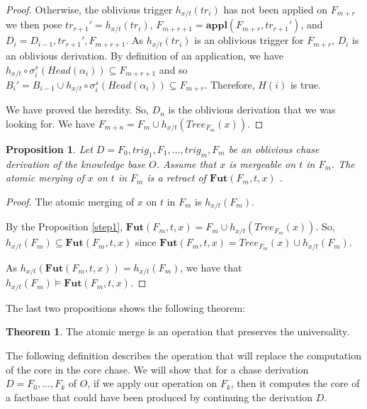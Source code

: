 \documentclass{article}
\newtheorem{proposition}{Proposition}[section]
\theoremstyle{definition}
\newtheorem{theorem}{Theorem}[section]
\theoremstyle{remark}
\newcommand{\Appl}{\textbf{appl}}
\newcommand{\Tree}{\textit{Tree}}
\newcommand{\Fut}{\textbf{Fut}}
\begin{document}
\begin{proof}
Otherwise, the oblivious trigger $h_{x/t}(tr_{i})$ has not been applied on $F_{m+r}$ we then pose $tr_{r+1}' = h_{x/t}(tr_{i})$, $F_{m+r+1} = \Appl(F_{m+r},tr_{r+1}')$, and $D_i = D_{i-1}, tr_{r+1}',F_{m+r+1}$. As $h_{x/t}(tr_{i})$ is an oblivious trigger for $F_{m+r}$, $D_i$ is an oblivious derivation. By definition of an application, we have $h_{x/t} \circ \sigma_i^s(Head(\alpha_i)) \subseteq F_{m+r+1}$ and so $B_i' = B_{i-1} \cup h_{x/t} \circ \sigma_i^s(Head(\alpha_i)) 	\subseteq F_{m+r}$. Therefore, $H(i)$ is true.


We have proved the heredity. So, $D_n$ is the oblivious derivation that we was looking for. We have $F_{m+n} = F_m \cup h_{x/t}(\Tree_{F_m}(x))$.

\end{proof}


\begin{proposition}
Let $D = F_0,trig_1,F_1,\ldots, trig_m,F_m$ be an oblivious chase derivation of the knowledge base $O$. Assume that $x$ is mergeable on $t$ in $F_m$. The atomic merging of $x$ on $t$ in $F_m$ is a retract of $\Fut(F_m,t,x)$ .
\end{proposition}

\begin{proof}
The atomic merging of $x$ on $t$ in $F_m$ is $h_{x/t}(F_m)$. 

By the Proposition \ref{step1}, $\Fut(F_m,t,x)= F_m \cup h_{x/t}(\Tree_{F_m}(x))$. So, $h_{x/t}(F_m) \subseteq \Fut(F_m,t,x) $ since $\Fut(F_m,t,x) = \Tree_{F_m}(x) \cup h_{x/t}(F_m)$.

As $h_{x/t}(\Fut(F_m,t,x)) = h_{x/t}(F_m)$, we have that $h_{x/t}(F_m) \models \Fut(F_m,t,x)$.
\end{proof}

The last two propositions shows the following theorem:

\begin{theorem} \label{universality atomic merge}
The atomic merge is an operation that preserves the universality.
\end{theorem}

The following definition describes the operation that will replace the computation of the core in the core chase. We will show that for a chase derivation $D =F_0,...,F_k$ of $O$, if we apply our operation on $F_k$, then it computes the core of a factbase that could have been produced by continuing the derivation $D$.
\end{document}
